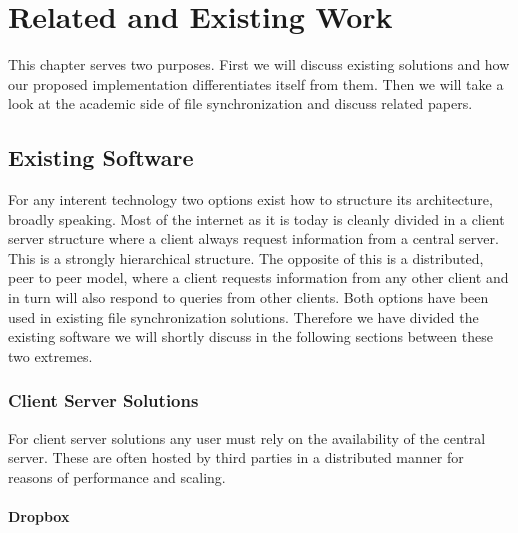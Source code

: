 \chapter{Related and Existing Work}
\label{chap:Related and Existing Work}

This chapter serves two purposes.
First we will discuss existing solutions and how our proposed implementation differentiates itself from them.
Then we will take a look at the academic side of file synchronization and discuss related papers.

\section{Existing Software}

For any interent technology two options exist how to structure its architecture, broadly speaking.
Most of the internet as it is today is cleanly divided in a client server structure where a client always request information from a central server.
This is a strongly hierarchical structure.
The opposite of this is a distributed, peer to peer model, where a client requests information from any other client and in turn will also respond to queries from other clients.
Both options have been used in existing file synchronization solutions.
Therefore we have divided the existing software we will shortly discuss in the following sections between these two extremes.

\subsection{Client Server Solutions}

For client server solutions any user must rely on the availability of the central server.
These are often hosted by third parties in a distributed manner for reasons of performance and scaling.

\subsubsection{Dropbox}

